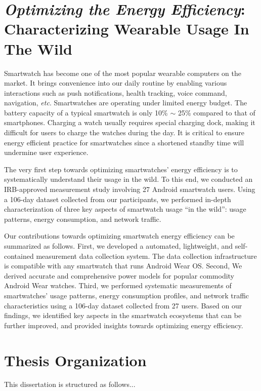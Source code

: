\section{\emph{Optimizing the Energy Efficiency}: Characterizing Wearable Usage In The Wild}
Smartwatch has become one of the most popular wearable computers on the market. It brings convenience into our daily routine by enabling various interactions such as push notifications, health tracking, voice command, navigation, \emph{etc}.    
Smartwatches are operating under limited energy budget. The battery capacity of a typical smartwatch is only 10\% $\sim$ 25\% compared to that of smartphones.
Charging a watch usually requires special charging dock, making it difficult for users
to charge the watches during the day. It is critical to ensure energy efficient practice for smartwatches since a shortened standby time will undermine user experience.

The very first step towards optimizing smartwatches' energy efficiency is to systematically understand their usage in the wild. To this end, we conducted an IRB-approved measurement study involving 27 Android smartwatch users. Using
a 106-day dataset collected from our participants, we performed in-depth
characterization of three key aspects of smartwatch usage “in
the wild”: usage patterns, energy consumption, and network traffic. 

Our contributions towards optimizing smartwatch energy efficiency can be summarized as follows. First, we developed a automated, lightweight, and self-contained measurement data collection system. The data collection infrastructure is compatible with any smartwatch that runs Android Wear OS. Second, We derived accurate and comprehensive power models for popular commodity Android Wear watches. Third, we performed systematic measurements of smartwatches’ usage
patterns, energy consumption profiles, and network traffic characteristics
using a 106-day dataset collected from 27 users. Based on
our findings, we identified key aspects in the smartwatch ecosystems
that can be further improved, and provided insights towards optimizing energy efficiency.


\section{Thesis Organization}

This dissertation is structured as follows...

